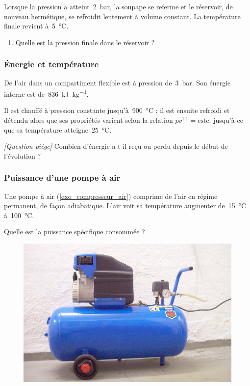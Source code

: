 	Lorsque la pression a atteint~\SI{2}{\bar}, la soupape se referme et le réservoir, de nouveau hermétique, se refroidit lentement à volume constant. La température finale revient à~\SI{5}{\degreeCelsius}.
	
	\begin{enumerate}
		\item Quelle est la pression finale dans le réservoir ?
	\end{enumerate}


\subsubsection{Énergie et température}
\label{exo_gp_energie_temperature}

	De l’air dans un compartiment flexible est à pression de~\SI{3}{\bar}. Son énergie interne est de~\SI{836}{\kilo\joule\per\kilogram}.
	
	Il est chauffé à pression constante jusqu’à~\SI{900}{\degreeCelsius} ; il est ensuite refroidi et détendu alors que ses propriétés varient selon la relation $p v^{\num{1.1}} = \text{cste.}$ jusqu’à ce que sa température atteigne~\SI{25}{\degreeCelsius}.

	\textit{[Question piège]} Combien d’énergie a-t-il reçu ou perdu depuis le début de l’évolution ?

\subsubsection{Puissance d’une pompe à air}
\label{exo_puissance_pompe_air}

	Une pompe à air (\cref{exo_compresseur_air}) comprime de l’air en régime permanent, de façon adiabatique. L’air voit sa température augmenter de~\SI{15}{\degreeCelsius} à~\SI{100}{\degreeCelsius}.
	
	Quelle est la puissance spécifique consommée ?

	\begin{figure}[!bh]
		\begin{center}
			\onlyframabook{\vspace{-0.3cm}}%
			\includegraphics[width=0.6\columnwidth]{images/compresseur_air_reservoir.jpg}
			\onlyframabook{\vspace{-0.6cm}}%
		\end{center}
		\label{fig_exo_compresseur_air}
	\end{figure}

